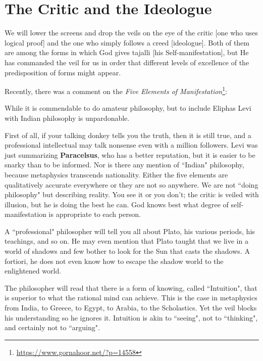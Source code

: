 \section{The Critic and the Ideologue}

\begin{quotex}
We will lower the screens and drop the veils on the eye of the critic [one who uses logical proof] and the one who simply follows a creed [ideologue]. Both of them are among the forms in which God gives tajalli [his Self-manifestation], but He has commanded the veil for us in order that different levels of excellence of the predisposition of forms might appear. 

\end{quotex}
Recently, there was a comment on the \textit{Five Elements of Manifestation}\footnote{\url{https://www.gornahoor.net/?p=14558}}:

\begin{quotex}
While it is commendable to do amateur philosophy, but to include Eliphas Levi with Indian philosophy is unpardonable.

\end{quotex}
First of all, if your talking donkey tells you the truth, then it is still true, and a professional intellectual may talk nonsense even with a million followers. Levi was just summarizing \textbf{Paracelsus}, who has a better reputation, but it is easier to be snarky than to be informed. Nor is there any mention of ``Indian" philosophy, because metaphysics transcends nationality. Either the five elements are qualitatively accurate everywhere or they are not so anywhere. We are not ``doing philosophy" but describing reality. You see it or you don't; the critic is veiled with illusion, but he is doing the best he can. God knows best what degree of self-manifestation is appropriate to each person.

A ``professional" philosopher will tell you all about Plato, his various periods, his teachings, and so on. He may even mention that Plato taught that we live in a world of shadows and few bother to look for the Sun that casts the shadows. A fortiori, he does not even know how to escape the shadow world to the enlightened world.

The philosopher will read that there is a form of knowing, called ``Intuition", that is superior to what the rational mind can achieve. This is the case in metaphysics from India, to Greece, to Egypt, to Arabia, to the Scholastics. Yet the veil blocks his understanding so he ignores it. Intuition is akin to ``seeing", not to ``thinking", and certainly not to ``arguing".

